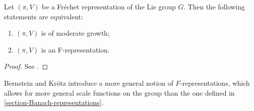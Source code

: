 \begin{lemma}
\label{lemma-F-moderate-growth} 
 Let $(\pi, V)$ be a Fr\'echet representation of the Lie group
$G$. Then the following statements are equivalent:
\begin{enumerate}
 \item  $(\pi,V)$ is of moderate growth;
 \item $(\pi, V)$ is an F-representation.
\end{enumerate}
\end{lemma}

\begin{proof}
See \cite[Lemma 2.10]{Bernstein-Kroetz}.
\end{proof}

\begin{remark}
\label{remark-generalscalefunctions}
 Bernstein and Kr\"otz introduce a more general notion of $F$-representations, which allows for more general scale functions on the group than the one defined in \ref{section-Banach-representations}.
\end{remark}




















